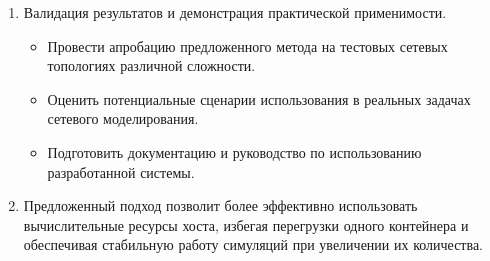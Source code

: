 \begin{enumerate}
\begin{itemize}
        \end{itemize}
    \item Валидация результатов и демонстрация практической применимости.
        \begin{itemize}
            \item Провести апробацию предложенного метода на тестовых сетевых топологиях различной сложности.
            \item Оценить потенциальные сценарии использования в реальных задачах сетевого моделирования.
            \item Подготовить документацию и руководство по использованию разработанной системы.
        \end{itemize}
    \item Предложенный подход позволит более эффективно использовать вычислительные ресурсы хоста, избегая перегрузки одного контейнера и обеспечивая стабильную работу симуляций при увеличении их количества.
\end{enumerate}
